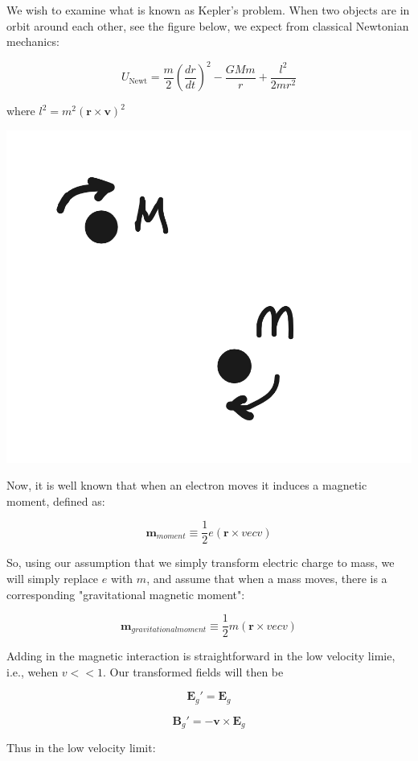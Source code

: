 \documentclass {article}
\renewcommand\vec{\mathbf}
\begin{document}
We wish to examine what is known as  Kepler's problem. When two objects are in orbit around each other, see the figure below, we expect from classical Newtonian mechanics:

$$ U_{\text{Newt}} = \frac m 2 (\frac {dr} {dt})^2 - \frac {GMm} r + \frac {l^2} {2mr^2}$$

where $l^2 = m^2 (\vec r \times \vec v)^2$

\begin{center}
	\includegraphics[scale=0.1]{autodraw.png}
\end{center}

Now, it is well known that when an electron moves it induces a magnetic moment, defined as:

$$\vec m_{moment} \equiv \frac 1 {2} e (\vec r \times vec v)$$

So, using our assumption that we simply transform electric charge to mass, we will simply replace $e$ with $m$, and assume that when a mass moves, there is a corresponding "gravitational magnetic moment":

$$\vec m_{gravitational moment} \equiv \frac 1 {2} m (\vec r \times vec v)$$

Adding in the magnetic interaction is straightforward in the low velocity limie, i.e., wehen $v << 1$. Our transformed fields will then be

$$\vec E_g' = \vec E_g$$

$$ \vec B_g' = - \vec v \times \vec E_g$$

Thus in the low velocity limit:
\end{document}
